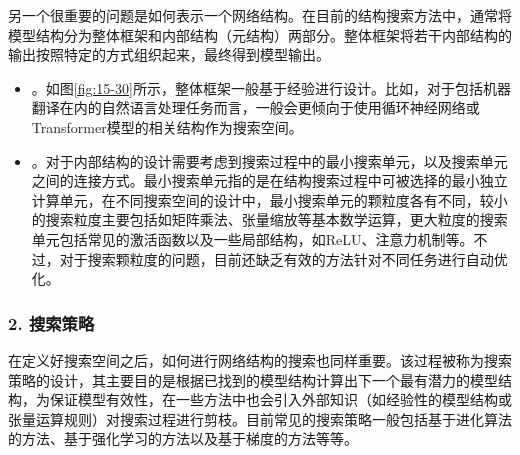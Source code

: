 \parinterval 另一个很重要的问题是如何表示一个网络结构。在目前的结构搜索方法中，通常将模型结构分为整体框架和内部结构（元结构）两部分。整体框架将若干内部结构的输出按照特定的方式组织起来，最终得到模型输出。

\begin{itemize}
\vspace{0.5em}
\item {\small{}}。如图\ref{fig:15-30}所示，整体框架一般基于经验进行设计。比如，对于包括机器翻译在内的自然语言处理任务而言，一般会更倾向于使用循环神经网络或Transformer模型的相关结构作为搜索空间。
\vspace{0.5em}
\item 	{\small{}}。对于内部结构的设计需要考虑到搜索过程中的最小搜索单元，以及搜索单元之间的连接方式。最小搜索单元指的是在结构搜索过程中可被选择的最小独立计算单元，在不同搜索空间的设计中，最小搜索单元的颗粒度各有不同，较小的搜索粒度主要包括如矩阵乘法、张量缩放等基本数学运算，更大粒度的搜索单元包括常见的激活函数以及一些局部结构，如ReLU、注意力机制等。不过，对于搜索颗粒度的问题，目前还缺乏有效的方法针对不同任务进行自动优化。
\vspace{0.5em}
\end{itemize}


\subsubsection{2. 搜索策略}

\parinterval 在定义好搜索空间之后，如何进行网络结构的搜索也同样重要。该过程被称为搜索策略的设计，其主要目的是根据已找到的模型结构计算出下一个最有潜力的模型结构，为保证模型有效性，在一些方法中也会引入外部知识（如经验性的模型结构或张量运算规则）对搜索过程进行剪枝。目前常见的搜索策略一般包括基于进化算法的方法、基于强化学习的方法以及基于梯度的方法等等。

